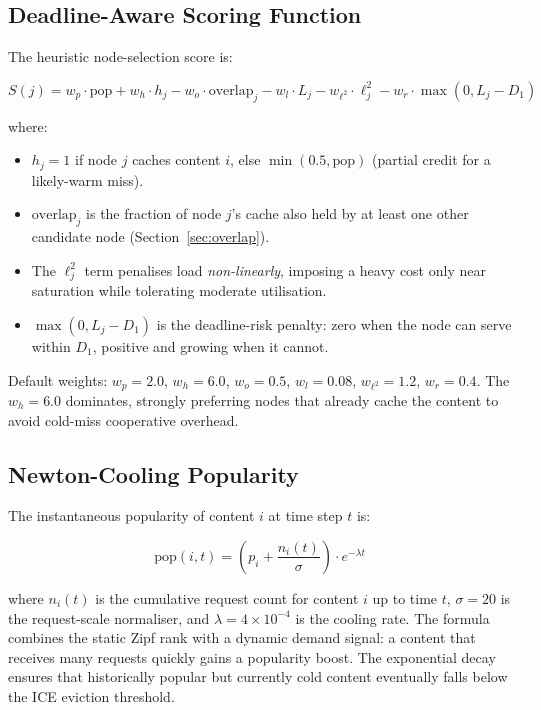 \documentclass[12pt]{article}
\begin{document}
\subsection{Deadline-Aware Scoring Function}
\label{sec:score}

The heuristic node-selection score is:

\begin{equation}
  S(j) = w_p \cdot \text{pop} + w_h \cdot h_j - w_o \cdot \text{overlap}_j - w_l \cdot L_{j} - w_{\ell^2} \cdot \ell_j^2 - w_r \cdot \max(0, L_j - D_1)
\end{equation}

where:
\begin{itemize}[noitemsep]
  \item $h_j = 1$ if node $j$ caches content $i$, else $\min(0.5, \text{pop})$ (partial credit for a likely-warm miss).
  \item $\text{overlap}_j$ is the fraction of node $j$'s cache also held by at least one other candidate node (Section~\ref{sec:overlap}).
  \item The $\ell_j^2$ term penalises load \emph{non-linearly}, imposing a heavy cost only near saturation while tolerating moderate utilisation.
  \item $\max(0, L_j - D_1)$ is the deadline-risk penalty: zero when the node can serve within $D_1$, positive and growing when it cannot.
\end{itemize}

Default weights: $w_p = 2.0$, $w_h = 6.0$, $w_o = 0.5$, $w_l = 0.08$, $w_{\ell^2} = 1.2$, $w_r = 0.4$. The $w_h = 6.0$ dominates, strongly preferring nodes that already cache the content to avoid cold-miss cooperative overhead.

\subsection{Newton-Cooling Popularity}
\label{sec:newtoncool}

The instantaneous popularity of content $i$ at time step $t$ is:

\begin{equation}
  \text{pop}(i, t) = \left( p_i + \frac{n_i(t)}{\sigma} \right) \cdot e^{-\lambda t}
\end{equation}

where $n_i(t)$ is the cumulative request count for content $i$ up to time $t$, $\sigma = 20$ is the request-scale normaliser, and $\lambda = 4 \times 10^{-4}$ is the cooling rate. The formula combines the static Zipf rank with a dynamic demand signal: a content that receives many requests quickly gains a popularity boost. The exponential decay ensures that historically popular but currently cold content eventually falls below the ICE eviction threshold.
\end{document}
